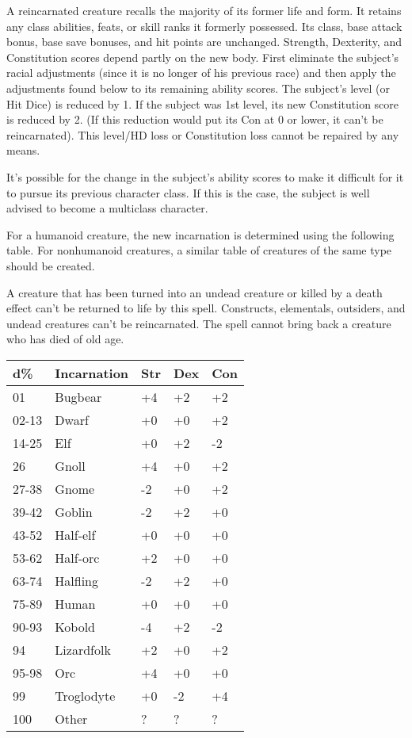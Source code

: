 \begin{multicols}{2}
\begin{small}
\smallskip\noindent A reincarnated creature recalls the majority of its former life and form. It retains any class abilities, feats, or skill ranks it formerly possessed. Its class, base attack bonus, base save bonuses, and hit points are unchanged. Strength, Dexterity, and Constitution scores depend partly on the new body. First eliminate the subject's racial adjustments (since it is no longer of his previous race) and then apply the adjustments found below to its remaining ability scores. The subject's level (or Hit Dice) is reduced by 1. If the subject was 1st level, its new Constitution score is reduced by 2. (If this reduction would put its Con at 0 or lower, it can't be reincarnated). This level/HD loss or Constitution loss cannot be repaired by any means.

\smallskip\noindent It's possible for the change in the subject's ability scores to make it difficult for it to pursue its previous character class. If this is the case, the subject is well advised to become a multiclass character.

\smallskip\noindent For a humanoid creature, the new incarnation is determined using the following table. For nonhumanoid creatures, a similar table of creatures of the same type should be created.

\smallskip\noindent A creature that has been turned into an undead creature or killed by a death effect can't be returned to life by this spell.  Constructs, elementals, outsiders, and undead creatures can't be reincarnated. The spell cannot bring back a creature who has died of old age.

\begin{center}
\begin{tabular}[h!]{l|llll}
d\%   & Incarnation & Str & Dex & Con \\ \hline
01    & Bugbear & +4 & +2 & +2 \\	   
02-13 & Dwarf & +0 & +0 & +2 \\	   
14-25 & Elf & +0 & +2 & -2 \\	   
26    & Gnoll & +4 & +0 & +2 \\	   
27-38 & Gnome & -2 & +0 & +2 \\	   
39-42 & Goblin  & -2 & +2 & +0 \\	   
43-52 & Half-elf & +0 & +0 & +0 \\	   
53-62 & Half-orc & +2 & +0 & +0	\\   
63-74 & Halfling & -2 & +2 & +0 \\   
75-89 & Human & +0 & +0 & +0 \\   
90-93 & Kobold & -4 & +2 & -2 \\   
94    & Lizardfolk & +2 & +0 & +2	\\   
95-98 & Orc & +4 & +0 & +0 \\   
99    & Troglodyte & +0 & -2 & +4 \\	   
100   & Other & ? & ? & ? \\
\end{tabular}
\end{center}


\end{small}
\end{multicols}
